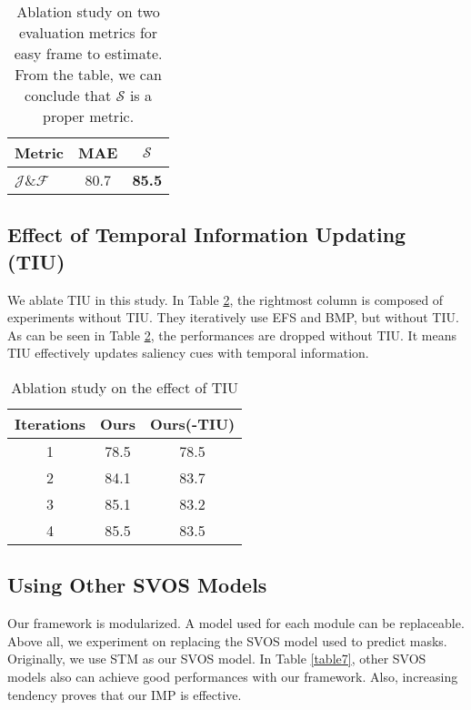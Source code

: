 \documentclass[letterpaper]{article} \usepackage{aaai22}  \usepackage{times}  \usepackage{helvet}  \usepackage{courier}  \usepackage[hyphens]{url}  \usepackage{graphicx} \urlstyle{rm} \def\UrlFont{\rm}  \usepackage{natbib}  \usepackage{caption} \DeclareCaptionStyle{ruled}{labelfont=normalfont,labelsep=colon,strut=off} \frenchspacing  \setlength{\pdfpagewidth}{8.5in}  \setlength{\pdfpageheight}{11in}  \usepackage{algorithm}
\begin{document}
\begin{table}[h]
\centering
\caption{Ablation study on two evaluation metrics for easy frame to estimate. From the table, we can conclude that $\mathcal{S}$ is a proper metric.
}\begin{tabular}{l|cc}
\toprule
Metric & MAE    & $\mathcal{S}$\\ \midrule
$\mathcal{J}$\&$\mathcal{F}$     & 80.7 & \textbf{85.5}\\ \bottomrule
\end{tabular}
\label{table5}
\end{table}

\subsection{Effect of Temporal Information Updating (TIU)}

We ablate TIU in this study.
In Table \ref{table6}, the rightmost column is composed of experiments without TIU. They iteratively use EFS and BMP, but without TIU. As can be seen in Table \ref{table6}, the performances are dropped without TIU.
It means TIU effectively updates saliency cues with temporal information.

\begin{table}[h]
\centering
\caption{Ablation study on the effect of TIU}
\label{table6}
\begin{tabular}{@{}c|cc@{}}
\toprule
Iterations & Ours & Ours(-TIU) \\ \midrule
1          & 78.5 & 78.5       \\
2          & 84.1 & 83.7       \\
3          & 85.1 & 83.2       \\
4          & 85.5 & 83.5       \\ \bottomrule
\end{tabular}
\end{table}

\subsection{Using Other SVOS Models}

Our framework is modularized. A model used for each module can be replaceable. Above all, we experiment on replacing the SVOS model used to predict masks. Originally, we use STM \citep{oh2019video} as our SVOS model. In Table \ref{table7}, other SVOS models \citep{oh2018fast,seong2020kernelized} also can achieve good performances with our framework. Also, increasing tendency proves that our IMP is effective.
\end{document}
